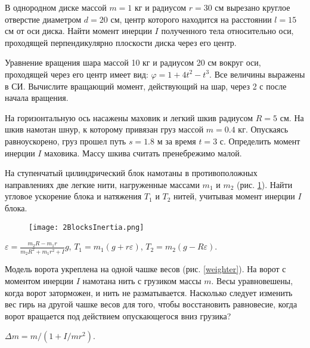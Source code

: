 \begin{ex}
В однородном диске массой $m = 1$ кг и радиусом $r = 30$ см вырезано круглое отверстие диаметром $d = 20$ см, центр которого находится на расстоянии $l = 15$ см от оси диска. Найти момент инерции $I$ полученного тела относительно оси, проходящей перпендикулярно плоскости диска через его центр.
\end{ex}	

\begin{ex}
Уравнение вращения шара массой 10 кг и радиусом 20 см вокруг оси, проходящей через его центр имеет вид: $\varphi = 1 + 4t^2 - t^3$. Все величины выражены в СИ. Вычислите вращающий момент, действующий на шар, через 2 с после начала вращения.
\end{ex}	

\begin{ex}
На горизонтальную ось насажены маховик и легкий шкив радиусом $R = 5$ см. На шкив намотан шнур, к которому привязан груз массой $m = 0.4$ кг. Опускаясь равноускорено, груз прошел путь $s = 1.8$ м за время $t = 3$ с. Определить момент инерции $I$ маховика. Массу шкива считать пренебрежимо малой.
\end{ex}	

\complexProblems

\begin{ex} %
На ступенчатый цилиндрический блок намотаны в противоположных направлениях две легкие нити, нагруженные массами $m_1$ и $m_2$ (рис. \ref{2BlocksInertia}). Найти угловое ускорение блока и натяжения $T_1$ и $T_2$ нитей, учитывая момент инерции $I$ блока.

\begin{figure}[h]
\centering
\texttt{[image: 2BlocksInertia.png]}
\caption{}
\label{2BlocksInertia}
\end{figure}

\begin{ans}
$\varepsilon = \frac{m_2R - m_1r}{m_2R^2 + m_1r^2 + I}g$, $T_1 = m_1(g+r\varepsilon)$, $T_2 = m_2(g-R\varepsilon)$.
\end{ans}
\end{ex}	

\begin{ex} %
Модель ворота укреплена на одной чашке весов (рис. \ref{weighter}). На ворот с моментом инерции $I$ намотана нить с грузиком массы $m$. Весы уравновешены, когда ворот заторможен, и нить не разматывается. Насколько следует изменить вес гирь на другой чашке весов для того, чтобы восстановить равновесие, когда ворот вращается под действием опускающегося вниз грузика?
\begin{ans}
$\Delta m = m/(1+I/mr^2)$.
\end{ans}
\end{ex}	

